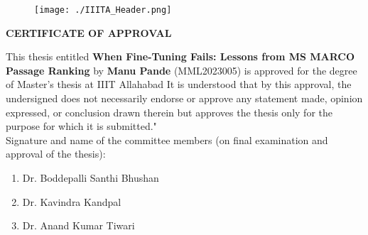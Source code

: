 \begin{spacing}{2.0}
\begin{flushright}
\begin{minipage}{0.5\textwidth}
\begin{spacing}{1.5}
\end{spacing}
\cleardoublepage

\begin{figure}[htp]
    \texttt{[image: ./IIITA\_Header.png]}
\end{figure}
\thispagestyle{empty}
\vspace*{.06\textheight}

\begin{spacing}{1.5}
\begin{center}
    {\centering\large\bfseries CERTIFICATE OF APPROVAL \par\vspace{10pt}}
\end{center}

 This thesis entitled \textbf{When Fine-Tuning Fails: Lessons from MS MARCO Passage Ranking}  by \textbf{Manu Pande} (MML2023005) is approved for the degree of Master's thesis at IIIT Allahabad  It is understood that by this approval, the undersigned does not necessarily endorse or approve any statement made, opinion expressed, or conclusion drawn
therein but approves the thesis only for the purpose for which it is submitted."\\[40 pt]

 Signature and name of the committee members (on final examination and approval of the thesis): \\[10 pt]
 \begin{flushleft}
     \begin{enumerate}
         \item Dr. Boddepalli Santhi Bhushan \\[25pt]
         \item Dr. Kavindra Kandpal\\[25 pt]
         \item Dr. Anand Kumar Tiwari \\[25 pt]

     \end{enumerate}
 \end{flushleft}
 \vspace{20 pt}
 \begin{flushright}
     \begin{minipage}{0.5\textwidth}
        \flushright \vspace{60 pt}
        \underline{\hspace{6cm}} \\
         \\[80pt]
    \end{minipage}
 \end{flushright}
\end{spacing} 


\end{minipage}
\end{flushright}
\end{spacing}
